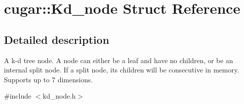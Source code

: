 \hypertarget{structcugar_1_1_kd__node}{}\section{cugar\+:\+:Kd\+\_\+node Struct Reference}
\label{structcugar_1_1_kd__node}


\subsection{Detailed description}
A k-\/d tree node. A node can either be a leaf and have no children, or be an internal split node. If a split node, its children will be consecutive in memory. Supports up to 7 dimensions. 

{\ttfamily \#include $<$kd\+\_\+node.\+h$>$}

